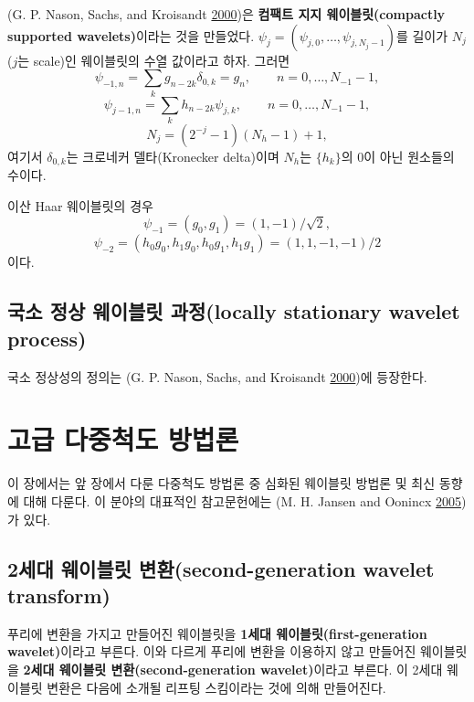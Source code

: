 \documentclass[b5paper,]{book}
\theoremstyle{definition}
\theoremstyle{definition}
\theoremstyle{definition}
\theoremstyle{remark}
\let\BeginKnitrBlock\begin \let\EndKnitrBlock\end
\begin{document}
(G. P. Nason, Sachs, and Kroisandt
\protect\hyperlink{ref-Nason2000}{2000})은 \textbf{컴팩트 지지
웨이블릿(compactly supported wavelets)}이라는 것을 만들었다.
\(\psi_{j}=(\psi_{j,0},\ldots,\psi_{j,N_{j}-1})\)를 길이가 \(N_{j}\)
(\(j\)는 scale)인 웨이블릿의 수열 값이라고 하자. 그러면
\[\psi_{-1,n}=\sum_{k}g_{n-2k}\delta_{0,k}=g_{n},\qquad{n=0,\ldots, N_{-1}-1},\]
\[\psi_{j-1,n}=\sum_{k}h_{n-2k}\psi_{j,k},\qquad{n=0,\ldots, N_{-1}-1},\]
\[N_{j}=(2^{-j}-1)(N_{h}-1)+1,\] 여기서 \(\delta_{0,k}\)는 크로네커
델타(Kronecker delta)이며 \(N_{h}\)는 \(\{h_{k}\}\)의 0이 아닌 원소들의
수이다.

\BeginKnitrBlock{example}[이산 Haar 웨이블릿]
\protect\hypertarget{exm:unnamed-chunk-144}{}{\label{exm:unnamed-chunk-144}
{} }이산 Haar 웨이블릿의 경우
\[\psi_{-1}=(g_{0},g_{1})=(1,-1)/\sqrt{2},\]
\[\psi_{-2}=(h_{0}g_{0},h_{1}g_{0},h_{0}g_{1},h_{1}g_{1})=(1,1,-1,-1)/2\]
이다.
\EndKnitrBlock{example}

\section{국소 정상 웨이블릿 과정(locally stationary wavelet
process)}\label{---locally-stationary-wavelet-process}

국소 정상성의 정의는 (G. P. Nason, Sachs, and Kroisandt
\protect\hyperlink{ref-Nason2000}{2000})에 등장한다.

\chapter{고급 다중척도 방법론}\label{admultiscale}

이 장에서는 앞 장에서 다룬 다중척도 방법론 중 심화된 웨이블릿 방법론 및
최신 동향에 대해 다룬다. 이 분야의 대표적인 참고문헌에는 (M. H. Jansen
and Oonincx \protect\hyperlink{ref-Jansen2005}{2005})가 있다.

\section{2세대 웨이블릿 변환(second-generation wavelet
transform)}\label{--second-generation-wavelet-transform}

푸리에 변환을 가지고 만들어진 웨이블릿을 \textbf{1세대
웨이블릿(first-generation wavelet)}이라고 부른다. 이와 다르게 푸리에
변환을 이용하지 않고 만들어진 웨이블릿을 \textbf{2세대 웨이블릿
변환(second-generation wavelet)}이라고 부른다. 이 2세대 웨이블릿 변환은
다음에 소개될 리프팅 스킴이라는 것에 의해 만들어진다.
\end{document}
